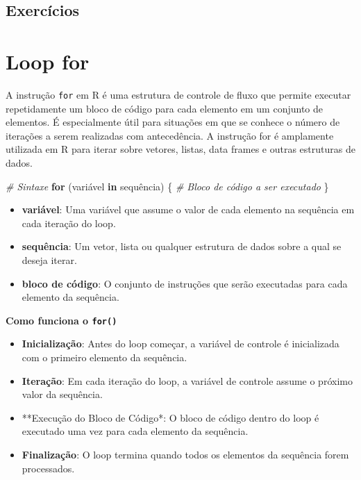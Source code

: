\documentclass[
]{book}
\newenvironment{Shaded}{\begin{snugshade}}{\end{snugshade}}
\newcommand{\CommentTok}[1]{\textcolor[rgb]{0.56,0.35,0.01}{\textit{#1}}}
\newcommand{\ControlFlowTok}[1]{\textcolor[rgb]{0.13,0.29,0.53}{\textbf{#1}}}
\newcommand{\NormalTok}[1]{#1}
\begin{document}
\section{Exercícios}\label{exercuxedcios-7}

\chapter{Loop for}\label{loop-for}

A instrução \texttt{for} em R é uma estrutura de controle de fluxo que permite executar repetidamente um bloco de código para cada elemento em um conjunto de elementos. É especialmente útil para situações em que se conhece o número de iterações a serem realizadas com antecedência. A instrução for é amplamente utilizada em R para iterar sobre vetores, listas, data frames e outras estruturas de dados.

\begin{Shaded}
\begin{Highlighting}[]
\CommentTok{\# Sintaxe}
\ControlFlowTok{for}\NormalTok{ (variável }\ControlFlowTok{in}\NormalTok{ sequência) \{}
  \CommentTok{\# Bloco de código a ser executado}
\NormalTok{\}}
\end{Highlighting}
\end{Shaded}

\begin{itemize}
\item
  \textbf{variável}: Uma variável que assume o valor de cada elemento na sequência em cada iteração do loop.
\item
  \textbf{sequência}: Um vetor, lista ou qualquer estrutura de dados sobre a qual se deseja iterar.
\item
  \textbf{bloco de código}: O conjunto de instruções que serão executadas para cada elemento da sequência.
\end{itemize}

\textbf{Como funciona o \texttt{for()}}

\begin{itemize}
\item
  \textbf{Inicialização}: Antes do loop começar, a variável de controle é inicializada com o primeiro elemento da sequência.
\item
  \textbf{Iteração}: Em cada iteração do loop, a variável de controle assume o próximo valor da sequência.
\item
  **Execução do Bloco de Código*: O bloco de código dentro do loop é executado uma vez para cada elemento da sequência.
\item
  \textbf{Finalização}: O loop termina quando todos os elementos da sequência forem processados.
\end{itemize}
\end{document}

